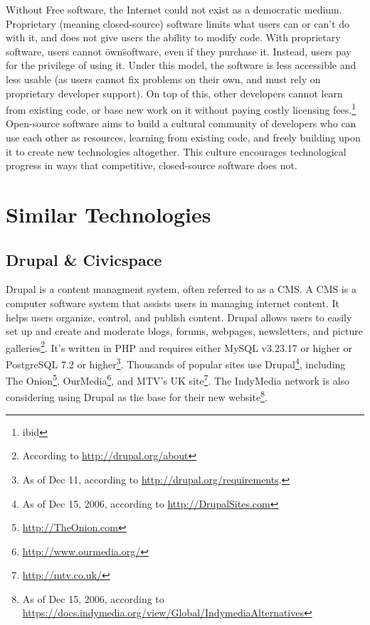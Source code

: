 \documentclass[a4paper,12pt]{report}
\begin{document}
    Without Free software, the Internet could not exist as a democratic medium.
Proprietary (meaning closed-source) software limits what users can or can't do with it, and does not give users the ability to modify code.
With proprietary software, users cannot \"own\" software, even if they purchase it.
Instead, users pay for the privilege of using it.
Under this model, the software is less accessible and less usable (as users cannot fix problems on their own, and must rely on proprietary developer support).
On top of this, other developers cannot learn from existing code, or base new work on it without paying costly licensing fees.\footnote{ibid} 
    Open-source software aims to build a cultural community of developers who can use each other as resources, learning from existing code, and freely building upon it to create new technologies altogether.
This culture encourages technological progress in ways that competitive, closed-source software does not. 

\section {Similar Technologies}

\subsection {Drupal \& Civicspace}
Drupal is a content managment system, often referred to as a CMS. 
A CMS is a computer software system that assists users in managing internet content.
It helps users organize, control, and publish content.
Drupal allows users to easily set up and create and moderate blogs, forums, webpages, newsletters, and picture galleries\footnote{According to \url{ http://drupal.org/about}}.
It's written in PHP and requires either MySQL v3.23.17 or higher or PostgreSQL 7.2 or higher\footnote{As of Dec 11, according to \url{ http://drupal.org/requirements}.}.
Thousands of popular sites use Drupal\footnote{As of Dec 15, 2006, according to \url{http://DrupalSites.com}}, including The Onion\footnote{\url{ http://TheOnion.com}}, OurMedia\footnote{\url{http://www.ourmedia.org/}}, and MTV's UK site\footnote{\url{http://mtv.co.uk/} }.
The IndyMedia network is also considering using Drupal as the base for their new website\footnote{As of Dec 15, 2006, according to \url{https://docs.indymedia.org/view/Global/IndymediaAlternatives} }.
\end{document}
